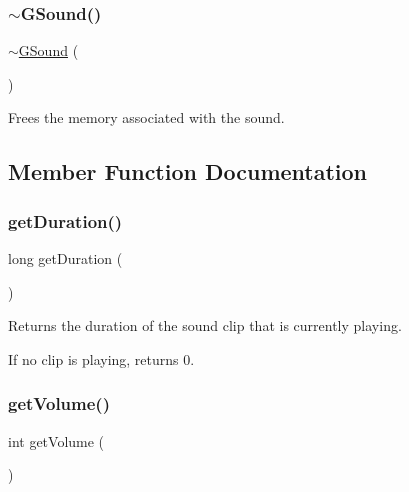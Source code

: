 \subsubsection{\texorpdfstring{$\sim$\+G\+Sound()}{~GSound()}}
{\footnotesize\ttfamily $\sim$\mbox{\hyperlink{classGSound}{G\+Sound}} (\begin{DoxyParamCaption}{ }\end{DoxyParamCaption})\hspace{0.3cm}{\ttfamily [virtual]}}



Frees the memory associated with the sound. 



\subsection{Member Function Documentation}
\mbox{\label{classGSound_affcaa1708a828c64648b58bd21223235}} 
\subsubsection{\texorpdfstring{get\+Duration()}{getDuration()}}
{\footnotesize\ttfamily long get\+Duration (\begin{DoxyParamCaption}{ }\end{DoxyParamCaption})\hspace{0.3cm}{\ttfamily [static]}}



Returns the duration of the sound clip that is currently playing. 

If no clip is playing, returns 0. \mbox{\label{classGSound_aac9746ddc550ec176b0957affafbdbe7}} 
\subsubsection{\texorpdfstring{get\+Volume()}{getVolume()}}
{\footnotesize\ttfamily int get\+Volume (\begin{DoxyParamCaption}{ }\end{DoxyParamCaption})\hspace{0.3cm}{\ttfamily [static]}}



